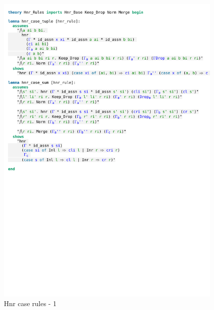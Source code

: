 \begin{figure}[htpb]
    \includegraphics[trim={0 13,6cm 0 1,6cm}, clip, width=1.00\textwidth]{figures/Theory_Hnr_Rules_Case_1.pdf}
    \caption[Hnr case rules - 1]{Hnr case rules - 1}
    \label{fig:hnr_case_1}
\end{figure}

